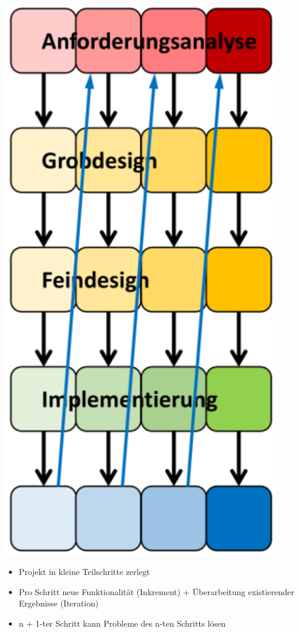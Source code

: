 \documentclass[11pt, a4paper]{article}
\begin{document}
\begin{minipage}[h]{0.2\textwidth}
    \centering \includegraphics[width=0.9\textwidth]{Vorgehen-06.png} 
    \raggedright
\end{minipage}
\begin{minipage}[h]{0.75\textwidth}
    \begin{itemize}
        \item Projekt in kleine Teilschritte zerlegt
        \item Pro Schritt neue Funktionalität (Inkrement) + Überarbeitung existierender Ergebnisse (Iteration)
        \item n + 1-ter Schritt kann Probleme des n-ten Schritts lösen
    \end{itemize}
\end{minipage}
\end{document}

